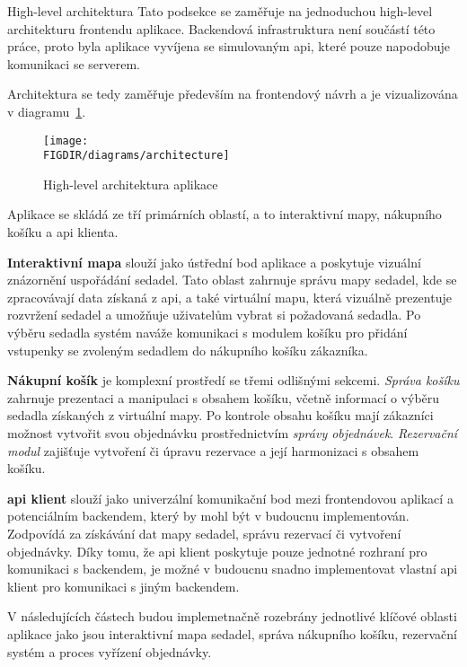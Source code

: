 \newpage
\begin{subsection}{High-level architektura}
    \label{subsec:implementace-architektura-high-level}
    Tato podsekce se zaměřuje na jednoduchou high-level architekturu frontendu aplikace.
    Backendová infrastruktura není součástí této práce, proto byla aplikace vyvíjena se simulovaným \ac{api}, které pouze napodobuje komunikaci se serverem.

    Architektura se tedy zaměřuje především na frontendový návrh a je vizualizována v diagramu~\ref{fig:implementace-architektura-high-level}.

    \begin{figure}[H]
        \centering
        \texttt{[image: \\FIGDIR/diagrams/architecture]}
        \caption{High-level architektura aplikace}
        \label{fig:implementace-architektura-high-level}
    \end{figure}

    Aplikace se skládá ze tří primárních oblastí, a to interaktivní mapy, nákupního košíku a \ac{api} klienta.

    \textbf{Interaktivní mapa} slouží jako ústřední bod aplikace a poskytuje vizuální znázornění uspořádání sedadel.
    Tato oblast zahrnuje správu mapy sedadel, kde se zpracovávají data získaná z \ac{api}, a také virtuální mapu, která vizuálně prezentuje rozvržení sedadel a umožňuje uživatelům vybrat si požadovaná sedadla.
    Po výběru sedadla systém naváže komunikaci s modulem košíku pro přidání vstupenky se zvoleným sedadlem do nákupního košíku zákazníka.

    \textbf{Nákupní košík} je komplexní prostředí se třemi odlišnými sekcemi.
    \textit{Správa košíku} zahrnuje prezentaci a manipulaci s obsahem košíku, včetně informací o výběru sedadla získaných z virtuální mapy.
    Po kontrole obsahu košíku mají zákazníci možnost vytvořit svou objednávku prostřednictvím \textit{správy objednávek}.
    \textit{Rezervační modul} zajišťuje vytvoření či úpravu rezervace a její harmonizaci s obsahem košíku.

    \textbf{\ac{api} klient} slouží jako univerzální komunikační bod mezi frontendovou aplikací a potenciálním backendem, který by mohl být v budoucnu implementován.
    Zodpovídá za získávání dat mapy sedadel, správu rezervací či vytvoření objednávky.
    Díky tomu, že \ac{api} klient poskytuje pouze jednotné rozhraní pro komunikaci s backendem, je možné v budoucnu snadno implementovat vlastní \ac{api} klient pro komunikaci s jiným backendem.

    V následujících částech budou implemetnačně rozebrány jednotlivé klíčové oblasti aplikace jako jsou interaktivní mapa sedadel, správa nákupního košíku, rezervační systém a proces vyřízení objednávky.
\end{subsection}
